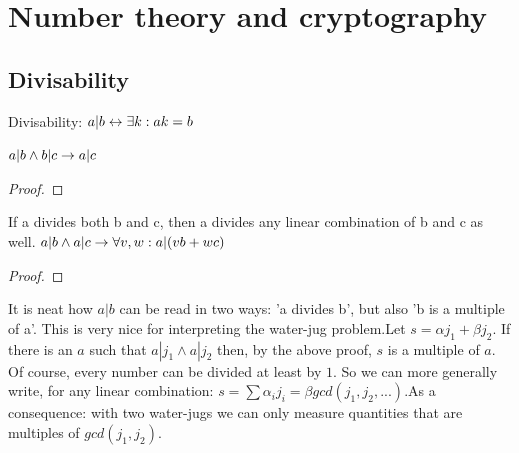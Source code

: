 \section{Number theory and cryptography}

\subsection{Divisability}

\begin{definition}
    Divisability: $a|b \leftrightarrow \exists k: ak = b$
\end{definition}

\begin{theorem}
    $ a|b \land b|c \to a|c  $
\end{theorem}

\begin{proof}
\end{proof}

\begin{theorem}
    If a divides both b and c, then a divides any linear combination of b and c as well.  $ a|b \land a|c \to \forall v, w: a| (vb + wc)  $
\end{theorem}

\begin{proof}
\end{proof}

It is neat how $a|b$ can be read in two ways: 'a divides b', but also 'b is a multiple of a'. This is very nice for interpreting the water-jug problem.Let $s = \alpha j_1 +\beta j_2$. If there is an $a$ such that $a|j_1 \land a|j_2$ then, by the above proof, $s$ is a multiple of $a$. Of course, every number can be divided at least by $1$. So we can more generally write, for any linear combination: $s = \sum \alpha_i j_i = \beta gcd(j_1, j_2, ...)$.As a consequence: with two water-jugs we can only measure quantities that are multiples of $gcd(j_1, j_2)$.


